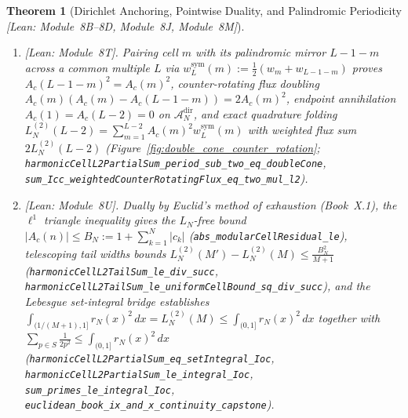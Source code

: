 \documentclass[11pt,a4paper]{article}
\newtheorem{theorem}{Theorem}[section]
\theoremstyle{definition}
\begin{document}
\begin{theorem}[Dirichlet Anchoring, Pointwise Duality, and Palindromic Periodicity \emph{[Lean: Module~8B--8D, Module~8J, Module~8M]}]
\begin{enumerate}[leftmargin=1.8em,itemsep=2pt]
\item \emph{[Lean: Module~8T].} Pairing cell $m$ with its palindromic mirror $L - 1 - m$ across a common multiple $L$ via $w_L^{\mathrm{sym}}(m) := \tfrac{1}{2}(w_m + w_{L-1-m})$ proves $A_c(L - 1 - m)^2 = A_c(m)^2$, counter-rotating flux doubling $A_c(m)(A_c(m) - A_c(L - 1 - m)) = 2 A_c(m)^2$, endpoint annihilation $A_c(1) = A_c(L - 2) = 0$ on $\mathcal{A}_N^{\mathrm{dir}}$, and exact quadrature folding $L_N^{(2)}(L-2) = \sum_{m=1}^{L-2} A_c(m)^2 w_L^{\mathrm{sym}}(m)$ with weighted flux sum $2 L_N^{(2)}(L-2)$ (Figure~\ref{fig:double_cone_counter_rotation}; \texttt{harmonicCellL2PartialSum\_\allowbreak period\_\allowbreak sub\_\allowbreak two\_\allowbreak eq\_\allowbreak doubleCone}, \texttt{sum\_\allowbreak Icc\_\allowbreak weightedCounterRotatingFlux\_\allowbreak eq\_\allowbreak two\_\allowbreak mul\_\allowbreak l2}).
\item \emph{[Lean: Module~8U].} Dually by Euclid's method of exhaustion (Book~X.1), the $\ell^1$ triangle inequality gives the $L_N$-free bound $|A_c(n)| \le B_N := 1 + \sum_{k=1}^N |c_k|$ (\texttt{abs\_\allowbreak modularCellResidual\_\allowbreak le}), telescoping tail widths bounds $L_N^{(2)}(M') - L_N^{(2)}(M) \le \frac{B_N^2}{M+1}$ (\texttt{harmonicCellL2TailSum\_\allowbreak le\_\allowbreak div\_\allowbreak succ}, \texttt{harmonicCellL2TailSum\_\allowbreak le\_\allowbreak uniformCellBound\_\allowbreak sq\_\allowbreak div\_\allowbreak succ}), and the Lebesgue set-integral bridge establishes $\int_{(1/(M+1), 1]} r_N(x)^2\,dx = L_N^{(2)}(M) \le \int_{(0,1]} r_N(x)^2\,dx$ together with $\sum_{p \in S}\frac{1}{2p^2} \le \int_{(0,1]} r_N(x)^2\,dx$ (\texttt{harmonicCellL2PartialSum\_\allowbreak eq\_\allowbreak setIntegral\_\allowbreak Ioc}, \texttt{harmonicCellL2PartialSum\_\allowbreak le\_\allowbreak integral\_\allowbreak Ioc}, \texttt{sum\_\allowbreak primes\_\allowbreak le\_\allowbreak integral\_\allowbreak Ioc}, \texttt{euclidean\_\allowbreak book\_\allowbreak ix\_\allowbreak and\_\allowbreak x\_\allowbreak continuity\_\allowbreak capstone}).
\end{enumerate}
\end{theorem}
\end{document}
